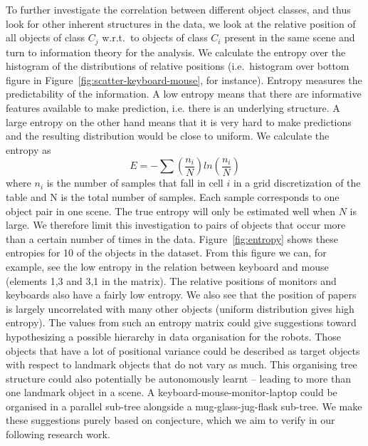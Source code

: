 \documentclass[letterpaper, 10 pt, conference]{ieeeconf}
\begin{document}
To further investigate the correlation between different object classes, and 
thus look for other inherent structures in the data, we look at 
the relative position of all objects of class $C_j$ w.r.t.\ to objects of 
class $C_i$ present in the same scene and turn to information theory for the 
analysis. We calculate the entropy over the histogram of the distributions 
of relative positions (i.e.\ histogram over bottom figure in 
Figure~\ref{fig:scatter-keyboard-mouse}, for instance). Entropy measures the 
predictability of the information. A low entropy means that there are 
informative features available to make prediction, i.e. there is an 
underlying structure. A large entropy on the other hand means that it is 
very hard to make predictions and the resulting distribution would be close 
to uniform.
We calculate the entropy as 
\begin{equation}
E=-\sum (\frac{n_i}{N})ln(\frac{n_i}{N})
\end{equation}
where $n_i$ is the number of samples that fall in cell $i$ in a grid 
discretization of the table and N is the total number of samples. Each 
sample corresponds to one object pair in one scene. The true entropy will 
only be estimated well when $N$ is large. We therefore limit this 
investigation to pairs of objects that occur more than a certain number of 
times in the data. Figure~\ref{fig:entropy} shows these entropies 
for 10 of the objects in the dataset. From this figure we can, for example, 
see the low entropy in the relation between keyboard and mouse (elements 1,3 
and 3,1 in the matrix). The relative positions of monitors and keyboards 
also have a fairly low entropy. We also see that the 
position of papers is largely uncorrelated with many other objects (uniform 
distribution gives high entropy). The values from such an entropy matrix 
could give suggestions toward hypothesizing a possible hierarchy in data 
organisation for the robots. Those objects that have a lot of positional 
variance could be described as target objects with respect to landmark 
objects that do not vary as much. This organising tree structure could also 
potentially be autonomously learnt -- leading to more than one landmark object in a scene. A keyboard-mouse-monitor-laptop could be organised in a parallel sub-tree alongside a mug-glass-jug-flask sub-tree. We make these suggestions purely based on conjecture, which we aim to verify in our following research work.
\end{document}
